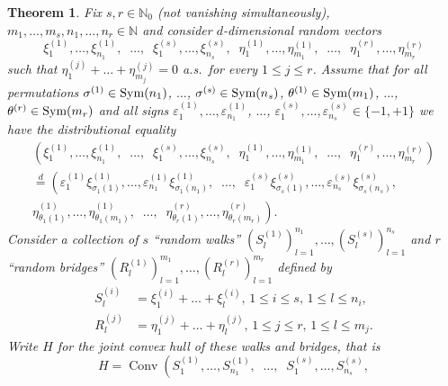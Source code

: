 \documentclass[12pt, reqno]{amsart}
\theoremstyle{plain}
\newtheorem{theorem}{Theorem}[section]
\theoremstyle{definition}
\theoremstyle{remark}
\begin{document}
\begin{theorem}\label{1435}
Fix $s,r\in {\mathbb{N}}_0$ (not vanishing simultaneously), $m_1,\ldots,m_s, n_1,\ldots,n_r\in{\mathbb{N}}$  and consider $d$-dimensional random vectors
\begin{equation}\label{1942}
\xi_1^{(1)}, \ldots, \xi_{n_1}^{(1)}, \;\; \ldots,\;\; \xi_1^{(s)}, \ldots, \xi_{n_s}^{(s)},\;\;
\eta_1^{(1)}, \ldots, \eta_{m_1}^{(1)},\;\; \ldots,\;\; \eta_1^{(r)}, \ldots, \eta_{m_r}^{(r)}
\end{equation}
such that $\eta_1^{(j)}+ \ldots+ \eta_{m_j}^{(j)}=0$ a.s.\ for every $1\leq j \leq r$.
Assume that for all permutations $\sigma^{(1)}\in {\text{\rm Sym}}(n_1)$, $\ldots$, $\sigma^{(s)} \in {\text{\rm Sym}}(n_s)$, $\theta^{(1)}\in {\text{\rm Sym}}(m_1)$, $\ldots$, $\theta^{(r)} \in {\text{\rm Sym}}(m_r)$ and all signs ${\varepsilon}_1^{(1)}, \ldots, {\varepsilon}_{n_1}^{(1)}$, $\ldots$, ${\varepsilon}_1^{(s)}, \ldots, {\varepsilon}_{n_s}^{(s)} \in \{-1, +1\}$ we have the distributional equality
\begin{multline} \label{eq:invar_product}
\left(
\xi_1^{(1)}, \ldots, \xi_{n_1}^{(1)}, \;\; \ldots,\;\; \xi_1^{(s)}, \ldots, \xi_{n_s}^{(s)},
\;\;
\eta_1^{(1)}, \ldots, \eta_{m_1}^{(1)},\;\; \ldots, \;\; \eta_1^{(r)}, \ldots, \eta_{m_r}^{(r)}
\right)\\
{\stackrel{d}{=}}
\left(
{\varepsilon}_1^{(1)} \xi_{\sigma_1(1)}^{(1)}, \ldots, {\varepsilon}_{n_1}^{(1)} \xi_{\sigma_1(n_1)}^{(1)},
\;\;\ldots, \;\;
{\varepsilon}_{1}^{(s)}\xi_{\sigma_s(1)}^{(s)}, \ldots, {\varepsilon}_{n_s}^{(s)}\xi_{\sigma_s(n_s)}^{(s)},\right.
\\
\left.\eta_{\theta_1(1)}^{(1)}, \ldots,  \eta_{\theta_1(m_1)}^{(1)},
\;\;\ldots,\;\;
\eta_{\theta_r(1)}^{(r)}, \ldots, \eta_{\theta_r(m_r)}^{(r)}
\right).
\end{multline}
Consider a collection of $s$ ``random walks'' $(S_l^{(1)})_{l=1}^{n_1},\ldots, (S_l^{(s)})_{l=1}^{n_s}$ and $r$ ``random bridges'' $(R_l^{(1)})_{l=1}^{m_1},\ldots, (R_l^{(r)})_{l=1}^{m_r}$ defined by
\begin{align*}
S_l^{(i)} &= \xi_1^{(i)} + \ldots + \xi_{l}^{(i)}, \,  1\leq i \leq s,\,  1\leq l \leq n_i,\\
R_l^{(j)} &= \eta_1^{(j)} + \ldots + \eta_{l}^{(j)}, \,  1\leq j \leq r,\,  1\leq l \leq m_j.
\end{align*}
Write $H$ for the joint convex hull of these walks and bridges, that is
\begin{equation}\label{eq:def_joint_convex_hull_H}
H={\mathop{\mathrm{Conv}}\nolimits} \left(S_1^{(1)}, \ldots, S_{n_1}^{(1)}, \;\; \ldots,\;\; S_1^{(s)}, \ldots, S_{n_s}^{(s)},

\end{equation}
\end{theorem}
\end{document}
